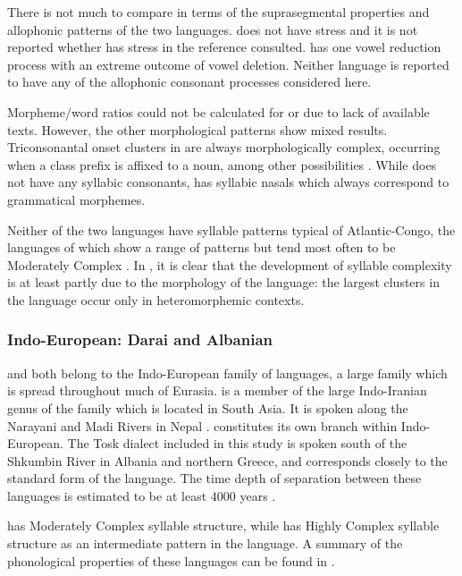   There is not much to compare in terms of the suprasegmental properties and allophonic patterns of the two languages.  does not have stress and it is not reported whether  has stress in the reference consulted.  has one vowel reduction process with an extreme outcome of vowel deletion. Neither language is reported to have any of the allophonic consonant processes considered here.

  Morpheme/word ratios could not be calculated for  or  due to lack of available texts. However, the other morphological patterns show mixed results. Triconsonantal onset clusters in  are always morphologically complex, occurring when a class prefix is affixed to a noun, among other possibilities \citep[23-24]{Kawasha2003}. While  does not have any syllabic consonants,  has syllabic nasals which always correspond to grammatical morphemes.

  Neither of the two languages have syllable patterns typical of Atlantic-Congo, the languages of which show a range of patterns but tend most often to be Moderately Complex \citep{Maddieson2013a}. In , it is clear that the development of syllable complexity is at least partly due to the morphology of the language: the largest clusters in the language occur only in heteromorphemic contexts.

\subsubsection{{Indo-European:} {Darai} {and} {Albanian}}\label{sec:8.4.3.5}

   and  both belong to the Indo-European family of languages, a large family which is spread throughout much of Eurasia.  is a member of the large Indo-Iranian genus of the family which is located in South Asia. It is spoken along the Narayani and Madi Rivers in Nepal \citep{Dhakal2012}.  constitutes its own branch within Indo-European. The Tosk dialect included in this study is spoken south of the Shkumbin River in Albania and northern Greece, and corresponds closely to the standard form of the language. The time depth of separation between these languages is estimated to be at least 4000 years \citep[146]{Garrett2006}.

   has Moderately Complex syllable structure, while  has Highly Complex syllable structure as an intermediate pattern in the language. A summary of the phonological properties of these languages can be found in .

